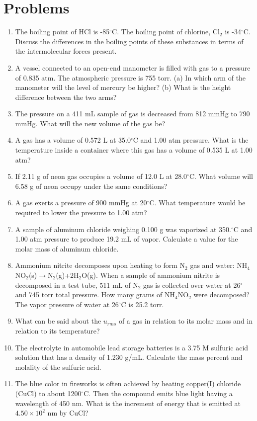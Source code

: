 \documentclass[../chem.tex]{subfiles}
\begin{document}
\section*{Problems}
\begin{enumerate}
    \item The boiling point of HCl is -85$^{\circ}$C. The boiling point of chlorine, Cl$_2$ is -34$^{\circ}$C. Discuss the differences in the boiling points of these substances in terms of the intermolecular forces present.
    \item A vessel connected to an open-end manometer is filled with gas to a pressure of 0.835 atm. The atmospheric pressure is 755 torr. (a) In which arm of the manometer will the level of mercury be higher? (b) What is the height difference between the two arms?
    \item The pressure on a 411 mL sample of gas is decreased from 812 mmHg to 790 mmHg. What will the new volume of the gas be?
    \item A gas has a volume of 0.572 L at 35.0$^{\circ}$C and 1.00 atm pressure. What is the temperature inside a container where this gas has a volume of 0.535 L at 1.00 atm?
    \item If 2.11 g of neon gas occupies a volume of 12.0 L at 28.0$^{\circ}$C. What volume will 6.58 g of neon occupy under the same conditions?
    \item A gas exerts a pressure of 900 mmHg at 20$^{\circ}$C. What temperature would be required to lower the pressure to 1.00 atm?
    \item A sample of aluminum chloride weighing 0.100 g was vaporized at 350.$^{\circ}$C and 1.00 atm pressure to produce 19.2 mL of vapor. Calculate a value for the molar mass of aluminum chloride.
    \item Ammonium nitrite decomposes upon heating to form N$_2$ gas and water: NH$_4$NO$_2$(s)$\rightarrow$N$_2$(g)+2H$_2$O(g). When a sample of ammonium nitrite is decomposed in a test tube, 511 mL of N$_2$ gas is collected over water at 26$^{\circ}$ and 745 torr total pressure. How many grams of NH$_4$NO$_2$ were decomposed? The vapor pressure of water at 26$^{\circ}$C is 25.2 torr.
    \item What can be said about the $u_{rms}$ of a gas in relation to its molar mass and in relation to its temperature?
    \item The electrolyte in automobile lead storage batteries is a 3.75 M sulfuric acid solution that has a density of 1.230 g/mL. Calculate the mass percent and molality of the sulfuric acid.
    \item The blue color in fireworks is often achieved by heating copper(I) chloride (CuCl) to about 1200$^{\circ}$C. Then the compound emits blue light having a wavelength of 450 nm. What is the increment of energy that is emitted at $4.50\times 10^{2}$ nm by CuCl?
\end{enumerate}
\end{document}
